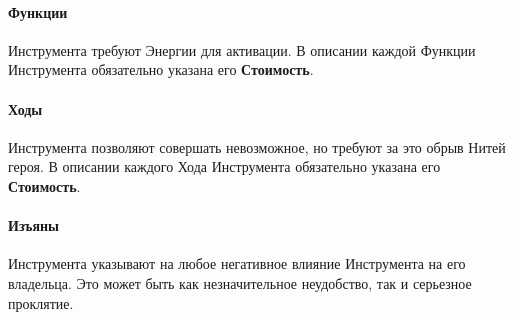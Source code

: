 \paragraph{Функции }Инструмента требуют Энергии для активации. В описании каждой Функции Инструмента обязательно указана его \textbf{Стоимость}.
\paragraph{Ходы }Инструмента позволяют совершать невозможное, но требуют за это обрыв Нитей героя. В описании каждого Хода Инструмента обязательно указана его \textbf{Стоимость}.
\paragraph{Изъяны }Инструмента указывают на любое негативное влияние Инструмента на его владельца. Это может быть как незначительное неудобство, так и серьезное проклятие.

